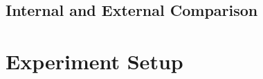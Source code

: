 \subsection{Internal and External Comparison}



\section{Experiment Setup}
\label{experiment_setup}

